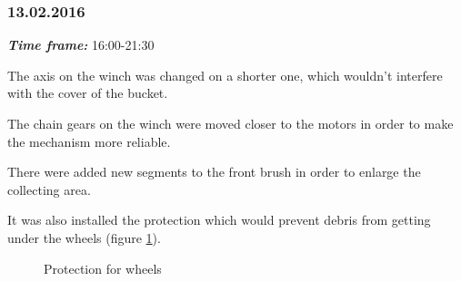 \subsubsection{13.02.2016}
\textit{\textbf{Time frame:}} 16:00-21:30 

The axis on the winch was changed on a shorter one, which wouldn't interfere with the cover of the bucket.

The chain gears on the winch were moved closer to the motors in order to make the mechanism more reliable.

There were added new segments to the front brush in order to enlarge the collecting area.

It was also installed the protection which would prevent debris from getting under the wheels (figure \ref{Protection1.3}).

\begin{figure}[H]
	\begin{minipage}[h]{1\linewidth}
		\caption{Protection for wheels}
		\label{Protection1.3}
	\end{minipage}
\end{figure}
